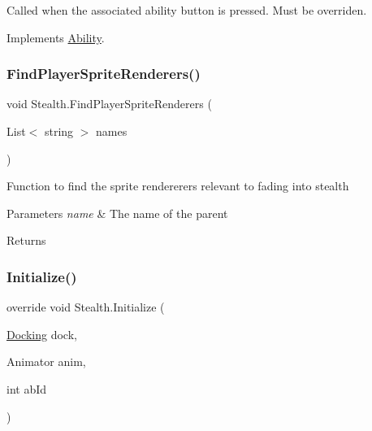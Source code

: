 Called when the associated ability button is pressed. Must be overriden. 



Implements \hyperlink{class_ability_a7722265862f8b29828315725415ce266}{Ability}.

\hypertarget{class_stealth_a94c470c41f796ad0079ae50f82f76fe5}{}\label{class_stealth_a94c470c41f796ad0079ae50f82f76fe5} 
\subsubsection{\texorpdfstring{Find\+Player\+Sprite\+Renderers()}{FindPlayerSpriteRenderers()}}
{\footnotesize\ttfamily void Stealth.\+Find\+Player\+Sprite\+Renderers (\begin{DoxyParamCaption}\item[{List$<$ string $>$}]{names }\end{DoxyParamCaption})}



Function to find the sprite rendererers relevant to fading into stealth 


\begin{DoxyParams}{Parameters}
{\em name} & The name of the parent\\
\hline
\end{DoxyParams}
\begin{DoxyReturn}{Returns}

\end{DoxyReturn}
\hypertarget{class_stealth_a3483f2663cee9ce06b7a6cd2675b6fc9}{}\label{class_stealth_a3483f2663cee9ce06b7a6cd2675b6fc9} 
\subsubsection{\texorpdfstring{Initialize()}{Initialize()}}
{\footnotesize\ttfamily override void Stealth.\+Initialize (\begin{DoxyParamCaption}\item[{\hyperlink{class_docking}{Docking}}]{dock,  }\item[{Animator}]{anim,  }\item[{int}]{ab\+Id }\end{DoxyParamCaption})\hspace{0.3cm}{\ttfamily [virtual]}}



